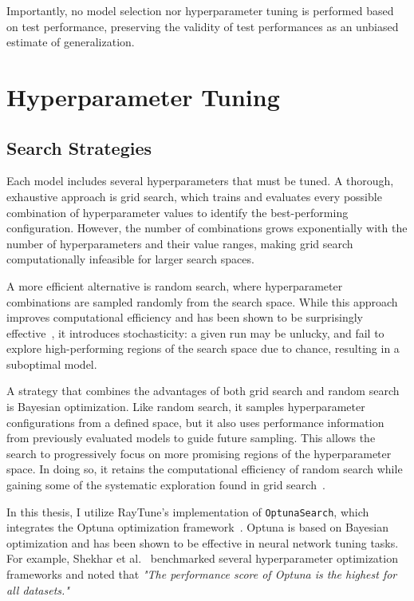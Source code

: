 Importantly, no model selection nor hyperparameter tuning is performed based on test performance, preserving the validity of test performances as an unbiased estimate of generalization.

\section{Hyperparameter Tuning}\label{HyperparameterTuning}

\subsection{Search Strategies}

Each model includes several hyperparameters that must be tuned. A thorough, exhaustive approach is grid search, which trains and evaluates every possible combination of hyperparameter values to identify the best-performing configuration. However, the number of combinations grows exponentially with the number of hyperparameters and their value ranges, making grid search computationally infeasible for larger search spaces. 

A more efficient alternative is random search, where hyperparameter combinations are sampled randomly from the search space. While this approach improves computational efficiency and has been shown to be surprisingly effective~\cite{bergstra2012random}, it introduces stochasticity: a given run may be unlucky, and fail to explore high-performing regions of the search space due to chance, resulting in a suboptimal model.

A strategy that combines the advantages of both grid search and random search is Bayesian optimization. Like random search, it samples hyperparameter configurations from a defined space, but it also uses performance information from previously evaluated models to guide future sampling. This allows the search to progressively focus on more promising regions of the hyperparameter space. In doing so, it retains the computational efficiency of random search while gaining some of the systematic exploration found in grid search~\cite{snoek2012practical}.

In this thesis, I utilize RayTune's implementation of \texttt{OptunaSearch}, which integrates the Optuna optimization framework~\cite{akiba2019optuna}. Optuna is based on Bayesian optimization and has been shown to be effective in neural network tuning tasks. For example, Shekhar et al.~\cite{shekhar2021comparative} benchmarked several hyperparameter optimization frameworks and noted that \textit{"The performance score of Optuna is the highest for all datasets."}

